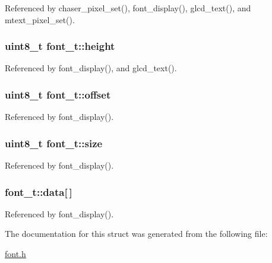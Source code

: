 Referenced by chaser\_\-pixel\_\-set(), font\_\-display(), glcd\_\-text(), and mtext\_\-pixel\_\-set().\hypertarget{structfont__t_5613f47d91a4c41070f30b5b12823186}{
\subsubsection{\setlength{\rightskip}{0pt plus 5cm}uint8\_\-t {\bf font\_\-t::height}}}
\label{structfont__t_5613f47d91a4c41070f30b5b12823186}




Referenced by font\_\-display(), and glcd\_\-text().\hypertarget{structfont__t_09ac4f1f9af22ab61ec68515d195c2b2}{
\subsubsection{\setlength{\rightskip}{0pt plus 5cm}uint8\_\-t {\bf font\_\-t::offset}}}
\label{structfont__t_09ac4f1f9af22ab61ec68515d195c2b2}




Referenced by font\_\-display().\hypertarget{structfont__t_bfce293635a0db6101751ca09c5b4e36}{
\subsubsection{\setlength{\rightskip}{0pt plus 5cm}uint8\_\-t {\bf font\_\-t::size}}}
\label{structfont__t_bfce293635a0db6101751ca09c5b4e36}




Referenced by font\_\-display().\hypertarget{structfont__t_a41cff431bd2bdba7ac28e21b564beb6}{
\subsubsection{ {\bf font\_\-t::data}\mbox{[}$\,$\mbox{]}}}
\label{structfont__t_a41cff431bd2bdba7ac28e21b564beb6}




Referenced by font\_\-display().

The documentation for this struct was generated from the following file:\begin{CompactItemize}
\item 
\hyperlink{font_8h}{font.h}\end{CompactItemize}
